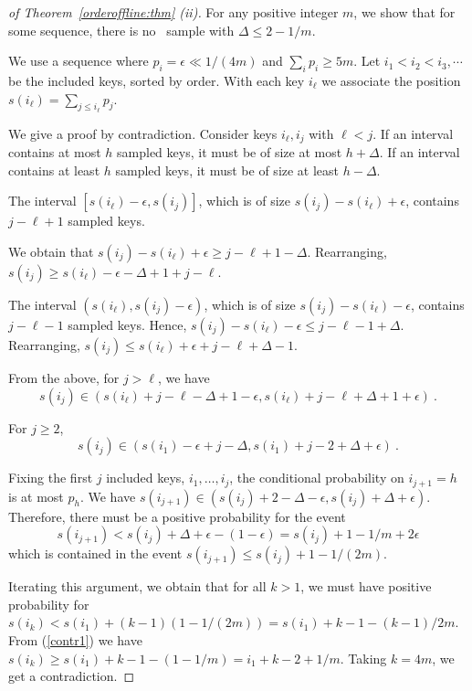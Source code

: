 \documentclass[11pt]{article}
\begin{document}
\begin{proof}[of Theorem~\ref{orderoffline:thm} (ii)]


For any positive integer $m$, 
we show that for some sequence, there is no \varopt\ sample with
$\Delta \leq 2-1/m$.

We use a sequence where $p_i= \epsilon \ll 1/(4m)$ and $\sum_i p_i \geq 5m$.
Let
$i_1<i_2<i_3,\cdots$ be the included keys, sorted by order.
With each key $i_\ell$ we associate the position 
$s(i_\ell)=\sum_{j\leq i_\ell} p_j$.

 We give a proof by contradiction.  
Consider keys $i_\ell,i_j$ with $\ell<j$.
If an interval contains at most $h$ sampled keys, it must be of size
at most $h+\Delta$.
If an interval contains at least $h$ sampled keys,  it must be of
size at least $h-\Delta$.

The interval $[s(i_\ell)-\epsilon,s(i_j)]$, which is of size
$s(i_j)-s(i_\ell)+\epsilon$, 
contains $j-\ell+1$ sampled keys.

We obtain that $s(i_j)-s(i_\ell)+\epsilon \geq j-\ell+1-\Delta$.
Rearranging, $s(i_j) \geq s(i_\ell)-\epsilon-\Delta+1+j-\ell$.

The interval $(s(i_\ell),s(i_j)-\epsilon)$, which is of size
$s(i_j)-s(i_\ell)-\epsilon$, contains 
$j-\ell-1$ sampled keys.
Hence,
$s(i_j)-s(i_\ell)-\epsilon \leq j-\ell-1+\Delta$.
Rearranging,
$s(i_j) \leq s(i_\ell)+\epsilon+j-\ell+\Delta-1$.

 From the above, 
for  $j>\ell$, we have
\begin{equation} \label{contrell}
 s(i_j) \in (s(i_\ell)+j-\ell-\Delta+1-\epsilon,s(i_\ell)+j-\ell+\Delta+1+\epsilon)\ .
\end{equation}


For $j\geq 2$, 
\begin{equation} \label{contr1}
s(i_j) \in (s(i_1)-\epsilon+j-\Delta,s(i_1)+j-2+\Delta+\epsilon)\ .
\end{equation}


 Fixing the first $j$ included keys, $i_1,\ldots,i_j$, 
the conditional probability on $i_{j+1}=h$ is at most $p_h$.
We have
$s(i_{j+1})\in (s(i_j)+2-\Delta-\epsilon, s(i_j)+\Delta+\epsilon)$.
Therefore, there must be a positive probability for the event
$$s(i_{j+1})< s(i_j)+\Delta+\epsilon-(1-\epsilon)= s(i_j)+1-1/m+2\epsilon$$
which is contained in the event
$s(i_{j+1})  \leq s(i_j)+1-1/(2m)$.  


 Iterating this argument, we obtain that for all $k>1$,
we must have positive probability
for $s(i_k) < s(i_1) + (k-1)(1-1/(2m))=s(i_1) +k-1 -(k-1)/2m$.  
From (\ref{contr1}) 
we have $s(i_k)\geq s(i_1) + k-1 -(1-1/m)=i_1+k-2+1/m$.
Taking $k=4m$, we get a contradiction.
\end{proof}
\end{document}
